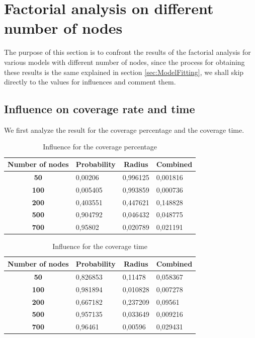\section{Factorial analysis on different number of nodes}
The purpose of this section is to confront the results of the factorial analysis for various models with different number of nodes, since the process for obtaining these results is the same explained in section \ref{sec:ModelFitting}, we shall skip directly to the values for influences and comment them.
\subsection{Influence on coverage rate and time}
We first analyze the result for the coverage percentage and the coverage time.

\begin{table}[H]
\centering
\begin{tabular}{|c|l|l|l|}
\hline
\textbf{Number of nodes} & \multicolumn{1}{c|}{\textbf{Probability}} & \multicolumn{1}{c|}{\textbf{Radius}} & \multicolumn{1}{c|}{\textbf{Combined}} \\ \hline
\textbf{50} & 0,00206 & 0,996125 & 0,001816 \\ \hline
\textbf{100} & 0,005405 & 0,993859 & 0,000736 \\ \hline
\textbf{200} & 0,403551 & 0,447621 & 0,148828 \\ \hline
\textbf{500} & 0,904792 & 0,046432 & 0,048775 \\ \hline
\textbf{700} & 0,95802 & 0,020789 & 0,021191 \\ \hline
\end{tabular}
\caption{Influence for the coverage percentage}
\end{table}

\begin{table}[H]
\centering
\begin{tabular}{|c|l|l|l|}
\hline
\multicolumn{1}{|l|}{\textbf{Number of nodes}} & \multicolumn{1}{c|}{\textbf{Probability}} & \multicolumn{1}{c|}{\textbf{Radius}} & \multicolumn{1}{c|}{\textbf{Combined}} \\ \hline
\textbf{50} & 0,826853 & 0,11478 & 0,058367 \\ \hline
\textbf{100} & 0,981894 & 0,010828 & 0,007278 \\ \hline
\textbf{200} & 0,667182 & 0,237209 & 0,09561 \\ \hline
\textbf{500} & 0,957135 & 0,033649 & 0,009216 \\ \hline
\textbf{700} & 0,96461 & 0,00596 & 0,029431 \\ \hline
\end{tabular}
\caption{Influence for the coverage time}
\end{table}

